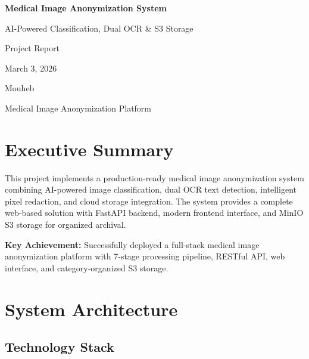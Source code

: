 \documentclass[12pt,a4paper]{article}
\begin{document}
\begin{titlepage}
    \centering
    \vspace*{2cm}
    
    {\Huge\bfseries Medical Image Anonymization System\par}
    \vspace{0.5cm}
    {\Large AI-Powered Classification, Dual OCR \& S3 Storage\par}
    
    \vspace{1.5cm}
    
    {\Large Project Report\par}
    \vspace{0.5cm}
    {\large March 3, 2026\par}
    
    \vfill
    
    {\large Mouheb\par}
    {\large Medical Image Anonymization Platform\par}
    
\end{titlepage}

\section*{Executive Summary}

This project implements a production-ready medical image anonymization system combining AI-powered image classification, dual OCR text detection, intelligent pixel redaction, and cloud storage integration. The system provides a complete web-based solution with FastAPI backend, modern frontend interface, and MinIO S3 storage for organized archival.

\begin{tcolorbox}[colback=gray!10,colframe=black]
\textbf{Key Achievement:} Successfully deployed a full-stack medical image anonymization platform with 7-stage processing pipeline, RESTful API, web interface, and category-organized S3 storage.
\end{tcolorbox}

\section{System Architecture}

\subsection{Technology Stack}
\end{document}

